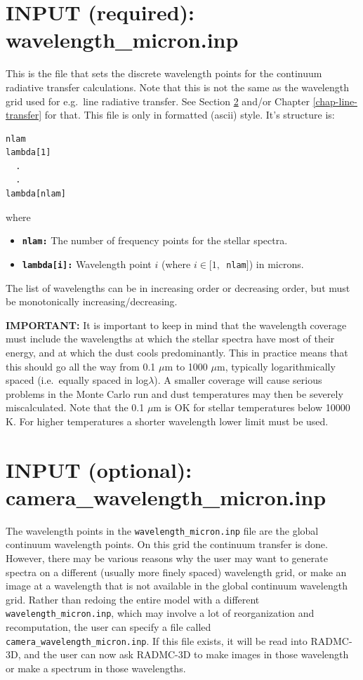 \documentclass{report}
\newenvironment{asciibox}%
  {\begin{list}{}{%
    \setlength{\topsep}{0.5em}%
    \setlength{\parskip}{0em}%
    \setlength{\parsep}{0em}%
    \setlength{\itemsep}{0em}%
    \setlength{\rightmargin}{0em}%
    \setlength{\leftmargin}{3.0em}%
    \setlength{\labelsep}{1em}%
    \setlength{\labelwidth}{2em}%
  }\normalfont\footnotesize\item}
  {\end{list}}
\begin{document}
\section{INPUT (required): wavelength\_micron.inp}
\label{sec-wavelengths}
%
This is the file that sets the discrete wavelength points for the continuum
radiative transfer calculations. Note that this is not the same as the
wavelength grid used for e.g.\ line radiative transfer.  See Section \ref{sec-camera-wavelengths} and/or Chapter \ref{chap-line-transfer} for
that. This file is only in formatted (ascii) style. It's structure is:
\begin{asciibox}\begin{verbatim}
nlam
lambda[1]
  .
  .
lambda[nlam]
\end{verbatim}\end{asciibox}
where
\begin{itemize}
\item[] {\small\tt\bf nlam:} The number of frequency points for the stellar
  spectra.
\item[] {\small\tt\bf lambda[i]:} Wavelength point $i$ (where $i\in [1,${\small\tt
    nlam}$]$) in microns.
\end{itemize}
The list of wavelengths can be in increasing order or decreasing order, but
must be monotonically increasing/decreasing. 

{\bf IMPORTANT:} It is important to keep in mind that the wavelength
coverage must include the wavelengths at which the stellar spectra have most
of their energy, and at which the dust cools predominantly.  This in
practice means that this should go all the way from 0.1 $\mu$m to 1000
$\mu$m, typically logarithmically spaced (i.e.~equally spaced in
log$\lambda$). A smaller coverage will cause serious problems in the Monte
Carlo run and dust temperatures may then be severely miscalculated. Note
that the 0.1 $\mu$m is OK for stellar temperatures below 10000 K. For higher
temperatures a shorter wavelength lower limit must be used.




\section{INPUT (optional): camera\_wavelength\_micron.inp}
\label{sec-camera-wavelengths}
%
The wavelength points in the {\small\tt wavelength\_micron.inp} file are the
global continuum wavelength points. On this grid the continuum transfer is
done. However, there may be various reasons why the user may want to
generate spectra on a different (usually more finely spaced) wavelength
grid, or make an image at a wavelength that is not available in the global
continuum wavelength grid. Rather than redoing the entire model with a
different {\small\tt wavelength\_micron.inp}, which may involve a lot of
reorganization and recomputation, the user can specify a file called {\small\tt
  camera\_wavelength\_micron.inp}. If this file exists, it will be read into
RADMC-3D, and the user can now ask RADMC-3D to make images in those
wavelength or make a spectrum in those wavelengths. 
\end{document}
